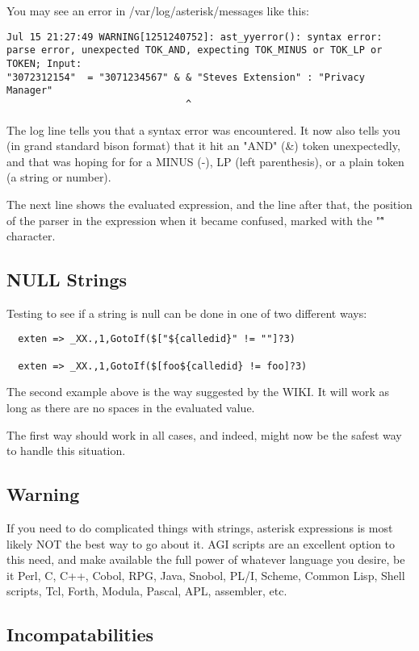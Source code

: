 You may see an error in /var/log/asterisk/messages like this:
\begin{verbatim}
Jul 15 21:27:49 WARNING[1251240752]: ast_yyerror(): syntax error: parse error, unexpected TOK_AND, expecting TOK_MINUS or TOK_LP or TOKEN; Input:
"3072312154"  = "3071234567" & & "Steves Extension" : "Privacy Manager" 
                               ^
\end{verbatim}

The log line tells you that a syntax error was encountered. It now
also tells you (in grand standard bison format) that it hit an "AND"
(\&) token unexpectedly, and that was hoping for for a MINUS (-), LP
(left parenthesis), or a plain token (a string or number).

The next line shows the evaluated expression, and the line after
that, the position of the parser in the expression when it became confused,
marked with the "\^" character.

\subsection{NULL Strings}
Testing to see if a string is null can be done in one of two different ways:
\begin{verbatim}
  exten => _XX.,1,GotoIf($["${calledid}" != ""]?3) 

  exten => _XX.,1,GotoIf($[foo${calledid} != foo]?3) 
\end{verbatim}

The second example above is the way suggested by the WIKI. It will 
work as long as there are no spaces in the evaluated value.

The first way should work in all cases, and indeed, might now
be the safest way to handle this situation.

\subsection{Warning}

If you need to do complicated things with strings, asterisk expressions
is most likely NOT the best way to go about it. AGI scripts are an
excellent option to this need, and make available the full power of
whatever language you desire, be it Perl, C, C++, Cobol, RPG, Java,
Snobol, PL/I, Scheme, Common Lisp, Shell scripts, Tcl, Forth, Modula,
Pascal, APL, assembler, etc.

\subsection{Incompatabilities}

